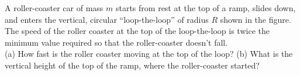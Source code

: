 A roller-coaster car of mass $m$ starts from rest at the top of a
ramp, slides down, and enters the vertical, circular
``loop-the-loop'' of radius $R$ shown in the figure. The speed of the
roller coaster at the top of the loop-the-loop is twice the minimum
value required so that the roller-coaster doesn't fall.\\
%
(a) How fast is the roller coaster moving at the top of the
loop?\answercheck\hwendpart
%
(b) What is the vertical height of the top of the ramp, where the
roller-coaster started?\answercheck
